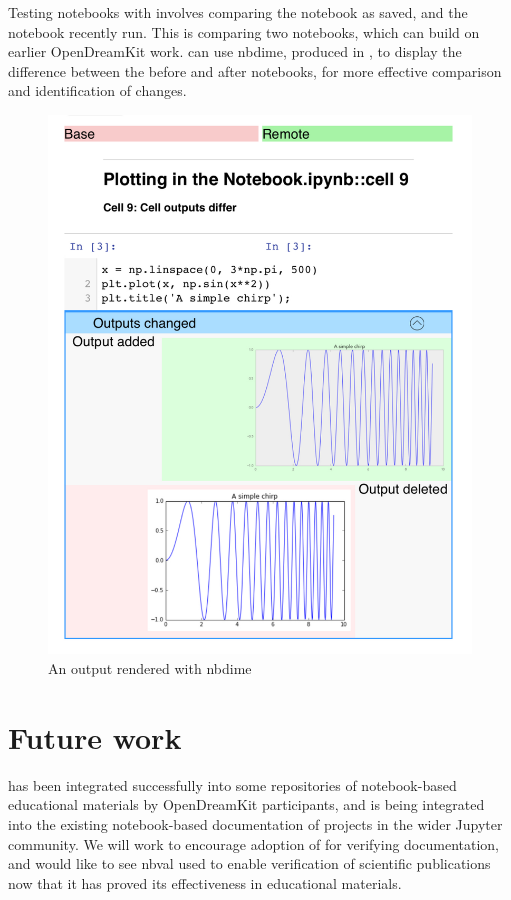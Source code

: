 \documentclass{deliverablereport}
\begin{document}
Testing notebooks with \nbval involves comparing the notebook as saved,
and the notebook recently run.
This is comparing two notebooks,
which can build on earlier OpenDreamKit work.
\nbval can use nbdime, produced in ,
to display the difference between the before and after notebooks,
for more effective comparison and identification of changes.

\begin{figure}[ht]
  \centering
  \includegraphics[width=.7\textwidth]{img/nbval-nbdime}
  \caption{An \nbval output rendered with nbdime}\label{fig:nbval-nbdime}
\end{figure}

\section{Future work} %

\nbval has been integrated successfully into some repositories of notebook-based educational materials by OpenDreamKit participants,
and is being integrated into the existing notebook-based documentation of projects in the wider Jupyter community.
We will work to encourage adoption of \nbval for verifying documentation,
and would like to see nbval used to enable verification of scientific publications
now that it has proved its effectiveness in educational materials.

\printbibliography
\end{document}
